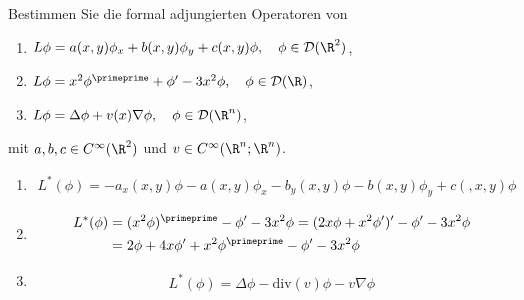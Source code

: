 
\begin{exercise}

Bestimmen Sie die formal adjungierten Operatoren von
\begin{enumerate}[label = (\roman*)]
  \item $L\phi = a(x,y)\phi_x + b(x,y)\phi_y + c(x,y)\phi, \quad \phi \in \mathcal{D}(\R^2)$,
  \item $L\phi = x^2\phi^{\primeprime} + \phi^{\prime} - 3x^2\phi, \quad \phi \in \mathcal{D}(\R)$,
  \item $L\phi = \Delta\phi + v(x)\nabla \phi, \quad \phi \in \mathcal{D}(\R^n)$,
\end{enumerate}
mit $a,b,c \in C^{\infty}(\R^2)$ und $v \in C^{\infty}(\R^n;\R^n)$.

\end{exercise}


\begin{solution}

\phantom{}

\begin{enumerate}[label = (\roman*)]
  \item
  \begin{align*}
    L^*(\phi) = -a_x(x,y)\phi - a(x,y)\phi_x - b_y(x,y)\phi - b(x,y)\phi_y + c(,x,y)\phi
  \end{align*}
  \item
  \begin{align*}
    L^*(\phi) &= (x^2\phi)^{\primeprime} - \phi^{\prime} -3x^2\phi
    = (2x\phi + x^2\phi^{\prime})^{\prime} - \phi^{\prime} -3x^2\phi \\
    &= 2\phi + 4x\phi^{\prime} + x^2\phi^{\primeprime} - \phi^{\prime} -3x^2\phi
  \end{align*}
  \item
  \begin{align*}
    L^*(\phi) = \Delta\phi -\mathrm{div}(v)\phi - v\nabla\phi
  \end{align*}
\end{enumerate}

\end{solution}

